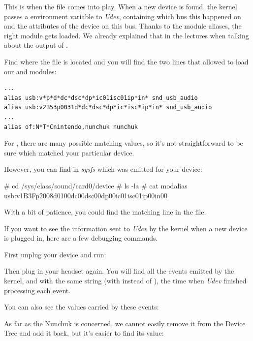 This is when the  file comes into play.
When a new device is found, the kernel passes a 
environment variable to {\em Udev}, containing which bus this
happened on and the attributes of the device on this bus.
Thanks to the module aliases, the right module gets loaded.
We already explained that in the lectures when talking about
the output of .

Find where the  file is located and
you will find the two lines that allowed to load our
 and  modules:

\begin{verbatim}
...
alias usb:v*p*d*dc*dsc*dp*ic01isc01ip*in* snd_usb_audio
alias usb:v2B53p0031d*dc*dsc*dp*ic*isc*ip*in* snd_usb_audio
...
alias of:N*T*Cnintendo,nunchuk nunchuk

\end{verbatim}

For , there are many possible matching values,
so it's not straightforward to be sure which matched your particular
device.

However, you can find in {\em sysfs} which 
was emitted for your device:

\begin{bashinput}
# cd /sys/class/sound/card0/device
# ls -la
# cat modalias
usb:v1B3Fp2008d0100dc00dsc00dp00ic01isc01ip00in00
\end{bashinput}

With a bit of patience, you could find the matching line in the
 file.

If you want to see the information sent to {\em Udev} by the
kernel when a new device is plugged in, here are a few debugging
commands.

First unplug your device and run:


Then plug in your headset again. You will find all the events emitted
by the kernel, and with the same string (with  instead of
), the time when {\em Udev} finished processing each event.

You can also see the  values carried by these events:


As far as the Nunchuk is concerned, we cannot easily remove it from the
Device Tree and add it back, but it's easier to find its 
value:

